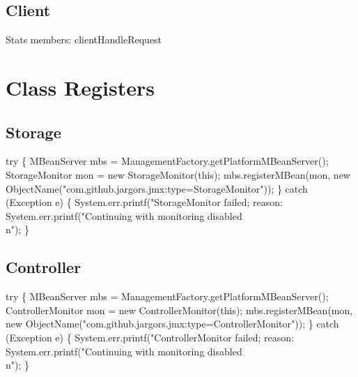 \subsection{Client}
\nwenddocs{}\endmoddef{}
\LA{}Stats members: clientHandleRequest~{\nwtagstyle{}}\RA{}
\nwendcode{}\nwdocspar

\section{Class Registers}
\subsection{Storage}
\nwenddocs{}\endmoddef{}
try \{
  MBeanServer mbs = ManagementFactory.getPlatformMBeanServer();
  StorageMonitor mon = new StorageMonitor(this);
  mbs.registerMBean(mon, new ObjectName("com.github.jargors.jmx:type=StorageMonitor"));
\} catch (Exception e) \{
  System.err.printf("StorageMonitor failed; reason: %
  System.err.printf("Continuing with monitoring disabled\\n");
\}
\nwendcode{}\nwdocspar

\subsection{Controller}
\nwenddocs{}\endmoddef{}
try \{
  MBeanServer mbs = ManagementFactory.getPlatformMBeanServer();
  ControllerMonitor mon = new ControllerMonitor(this);
  mbs.registerMBean(mon, new ObjectName("com.github.jargors.jmx:type=ControllerMonitor"));
\} catch (Exception e) \{
  System.err.printf("ControllerMonitor failed; reason: %
  System.err.printf("Continuing with monitoring disabled\\n");
\}
\nwendcode{}\nwdocspar

